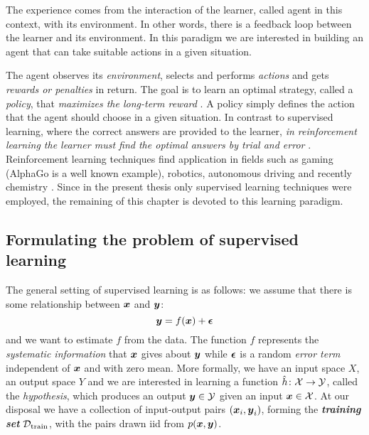 \begin{definition}
	The experience comes from the interaction of the learner, called
	agent in this context, with its environment. In other words,
	there is a feedback loop between the learner and its environment. In this
	paradigm we are interested in building an agent that can take suitable
	actions in a given situation.
\end{definition}

The agent observes its \emph{environment}, selects and performs \emph{actions}
and gets \emph{rewards or penalties} in return. The goal is to learn an optimal
strategy, called a \emph{policy}, that \emph{maximizes the long-term reward}
\parencite{ml}. A policy simply defines the action that the agent should
choose in a given situation. In contrast to supervised learning, where the
correct answers are provided to the learner, \emph{in reinforcement learning the
learner must find the optimal answers by trial and error}
\parencite{bishop2007}. Reinforcement learning techniques find application in
fields such as gaming (AlphaGo is a well known example), robotics, autonomous
driving and recently chemistry \parencite{li, Gow2022}. Since in the present
thesis only supervised learning techniques were employed, the remaining of this
chapter is devoted to this learning paradigm.

\subsection{Formulating the problem of supervised learning}
\label{subsec:supervised_learning}

The general setting of supervised learning is as follows: we assume that there
is some relationship between $\boldsymbol{x}$ and $\boldsymbol{y}$:
\begin{equation}
	\label{eq:supervised}
	\boldsymbol{y} = f(\boldsymbol{x}) + \boldsymbol{\epsilon}
\end{equation}
and we want to estimate $f$ from the data. The function $f$ represents the
\emph{systematic information} that $\boldsymbol{x}$ gives about $\boldsymbol{y}$ while
$\boldsymbol{\epsilon}$ is a random \emph{error term} independent of
$\boldsymbol{x}$ and with zero mean. More formally, we have an input space $X$, an output
space $Y$ and we are interested in learning a function $\hat{h} \colon \mathcal{X}
\to \mathcal{Y}$, called the \emph{hypothesis}, which produces an
output $\boldsymbol{y} \in \mathcal{Y}$ given an input $\boldsymbol{x} \in \mathcal{X}$. At our disposal we have a
collection of input-output pairs $(\boldsymbol{x}_i, \boldsymbol{y}_i)$, forming the
\emph{\textbf{training set}} $\mathcal{D}_\text{train}$, with the pairs drawn
\acrshort{iid} from $p(\boldsymbol{x}, \boldsymbol{y})$.

